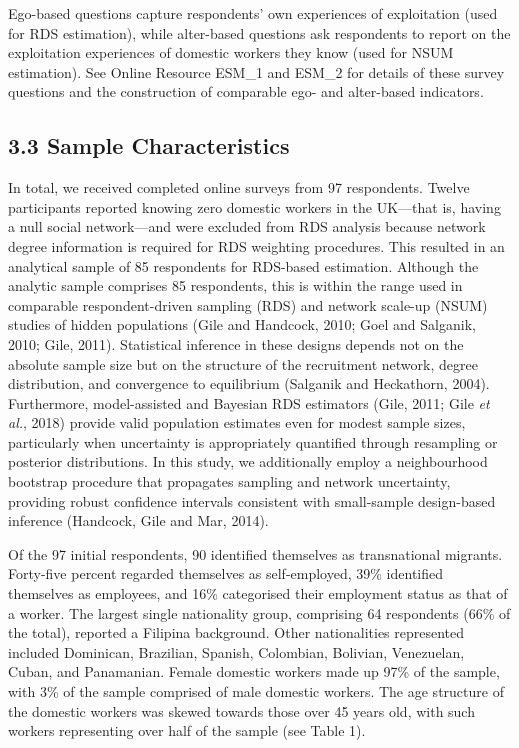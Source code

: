 \documentclass[
  12pt,
  letterpaper,
  DIV=11,
  numbers=noendperiod]{scrartcl}
\begin{document}
Ego-based questions capture respondents' own experiences of exploitation
(used for RDS estimation), while alter-based questions ask respondents
to report on the exploitation experiences of domestic workers they know
(used for NSUM estimation). See Online Resource ESM\_1 and ESM\_2 for
details of these survey questions and the construction of comparable
ego- and alter-based indicators.

\subsection{3.3 Sample Characteristics}\label{sample-characteristics}

In total, we received completed online surveys from 97 respondents.
Twelve participants reported knowing zero domestic workers in the
UK---that is, having a null social network---and were excluded from RDS
analysis because network degree information is required for RDS
weighting procedures. This resulted in an analytical sample of 85
respondents for RDS-based estimation. Although the analytic sample
comprises 85 respondents, this is within the range used in comparable
respondent-driven sampling (RDS) and network scale-up (NSUM) studies of
hidden populations (Gile and Handcock, 2010; Goel and Salganik, 2010;
Gile, 2011). Statistical inference in these designs depends not on the
absolute sample size but on the structure of the recruitment network,
degree distribution, and convergence to equilibrium (Salganik and
Heckathorn, 2004). Furthermore, model-assisted and Bayesian RDS
estimators (Gile, 2011; Gile \emph{et al.}, 2018) provide valid
population estimates even for modest sample sizes, particularly when
uncertainty is appropriately quantified through resampling or posterior
distributions. In this study, we additionally employ a neighbourhood
bootstrap procedure that propagates sampling and network uncertainty,
providing robust confidence intervals consistent with small-sample
design-based inference (Handcock, Gile and Mar, 2014).

Of the 97 initial respondents, 90 identified themselves as transnational
migrants. Forty-five percent regarded themselves as self-employed, 39\%
identified themselves as employees, and 16\% categorised their
employment status as that of a worker. The largest single nationality
group, comprising 64 respondents (66\% of the total), reported a
Filipina background. Other nationalities represented included Dominican,
Brazilian, Spanish, Colombian, Bolivian, Venezuelan, Cuban, and
Panamanian. Female domestic workers made up 97\% of the sample, with 3\%
of the sample comprised of male domestic workers. The age structure of
the domestic workers was skewed towards those over 45 years old, with
such workers representing over half of the sample (see Table 1).
\end{document}
